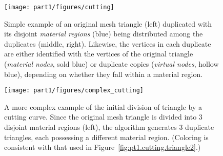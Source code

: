 \setlength{\figureheight}{0.25\columnwidth}
\begin{figure}[htbp]
\begin{center}
\texttt{[image: part1/figures/cutting]}
\caption{Simple example of an original mesh triangle (left) duplicated with its disjoint \emph{material regions} (blue) being distributed among the duplicates (middle, right). Likewise, the vertices in each duplicate are either identified with the vertices of the original triangle (\emph{material nodes}, sold blue) or duplicate copies (\emph{virtual nodes}, hollow blue), depending on whether they fall within a material region.}
\label{fig:pt1.cutting.triangle.2}
\end{center}
\end{figure}

\setlength{\figureheight}{0.25\columnwidth}
\begin{figure}[htbp]
\begin{center}
\texttt{[image: part1/figures/complex\_cutting]}
\caption{A more complex example of the initial division of triangle by a cutting curve. Since the original mesh triangle is divided into $3$ disjoint material regions (left), the algorithm generates $3$ duplicate triangles, each possessing a different material region. (Coloring is consistent with that used in Figure~\ref{fig:pt1.cutting.triangle2}.)}
\label{fig.complex_cutting}
\end{center}
\end{figure}

\renewcommand{\thechapter}{\arabic{chapter}}
